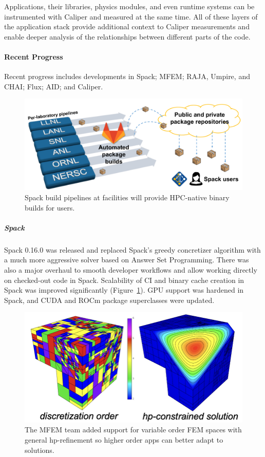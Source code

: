 Applications, their libraries, physics modules, and even runtime systems
can be instrumented with Caliper and measured at the same time.  All of
these layers of the application stack provide additional context to
Caliper measurements and enable deeper analysis of the relationships
between different parts of the code.



\paragraph{Recent Progress} %
Recent progress includes developments in Spack; MFEM; RAJA, Umpire, and CHAI; Flux; AID; and Caliper.


\begin{figure}[tb]
\centering
\includegraphics[width=.75\textwidth]{projects/2.3.6-NNSA/2.3.6.02-LLNL-ATDM/spack-pipelines.pdf}
\caption{Spack build pipelines at facilities will provide HPC-native binary builds for users.}
\label{figure:spack-build-pipeline}
\end{figure}


\subparagraph{Spack}
Spack 0.16.0 was released and replaced Spack's greedy concretizer algorithm with a much more aggressive solver based on Answer Set Programming.
There was also a major overhaul to smooth developer workflows and allow working directly on checked-out code in Spack.
Scalability of CI and binary cache creation in Spack was improved significantly (Figure~\ref{figure:spack-build-pipeline}).
GPU support was hardened in Spack, and CUDA and ROCm package superclasses were updated.


\begin{figure}[tb]
\centering
\includegraphics[width=.4\textwidth]{projects/2.3.6-NNSA/2.3.6.02-LLNL-ATDM/mfem-hp-refinement}
\caption{The MFEM team added support for variable order FEM spaces with general hp-refinement so higher order apps can better adapt to solutions.}
\label{figure:mfem-variable-order-fem}
\end{figure}

